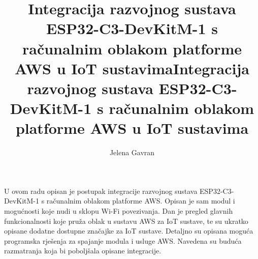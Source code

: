 \documentclass[times, utf8, seminar, numeric]{fer}
\renewcommand*\lstlistlistingname{Popis isječaka koda}
\begin{document}
	
	\title{Integracija razvojnog sustava ESP32-C3-DevKitM-1 s računalnim oblakom platforme AWS u IoT sustavima}
	
	\author{Jelena Gavran}
	
	
	\maketitle
	
	\tableofcontents
	
	\begingroup
	\renewcommand*\listfigurename{Popis slika}
	\listoffigures
	\endgroup
	
	
	
	
	
	
	
	
	
	
	
	
	\title{Integracija razvojnog sustava ESP32-C3-DevKitM-1 s računalnim oblakom platforme AWS u IoT sustavima}
	\begin{sazetak}
		U ovom radu opisan je postupak integracije razvojnog sustava ESP32-C3-DevKitM-1 s računalnim oblakom platforme AWS. Opisan je sam modul i mogućnosti koje nudi u sklopu Wi-Fi povezivanja. Dan je pregled glavnih funkcionalnosti koje pruža oblak u sustavu AWS za IoT sustave, te su ukratko opisane dodatne dostupne značajke za IoT sustave. Detaljno su opisana moguća programska rješenja za spajanje modula i usluge AWS. Navedena su buduća razmatranja koja bi poboljšala opisane integracije. 
		
	\end{sazetak}
	
\end{document}
